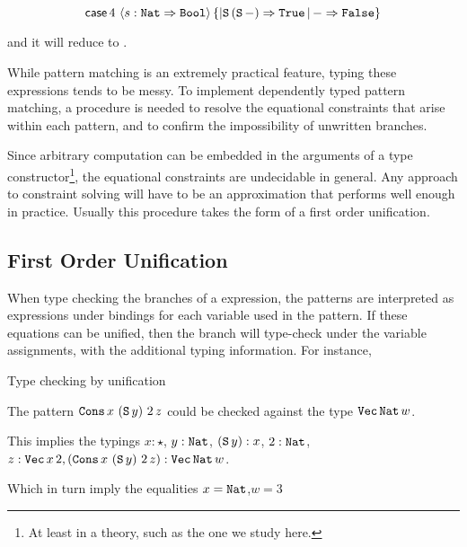 \[
\mathsf{case}{}\,4\,\left\langle s:\mathtt{Nat}{}\Rightarrow\mathtt{Bool}{}\right\rangle \left\{ |\mathtt{S}{}\left(\mathtt{S}{}\,-\right)\Rightarrow \mathtt{True}{}\,|\,-\Rightarrow \mathtt{False}{}\right\} 
\]

and it will reduce to \True{}.

While pattern matching is an extremely practical feature, typing these expressions tends to be messy.
To implement dependently typed pattern matching, a procedure is needed to resolve the equational constraints that arise within each pattern, and to confirm the impossibility of unwritten branches.

Since arbitrary computation can be embedded in the arguments of a type constructor\footnote{
  At least in a \fullSp{} theory, such as the one we study here.
}, the equational constraints are undecidable in general.
Any approach to constraint solving will have to be an approximation that performs well enough in practice.
Usually this procedure takes the form of a first order unification. 




\subsection{First Order Unification}

When type checking the branches of a \case{} expression, the patterns are interpreted as expressions under bindings for each variable used in the pattern.
If these equations can be unified, then the branch will type-check under the variable assignments, with the additional typing information.
For instance,
\begin{example}
Type checking by unification

The pattern $\mathtt{Cons}{}\,x\,\left(\mathtt{S}{}\,y\right)\,2\,z$ could be checked against the type $\mathtt{Vec}{}\,\mathtt{Nat}{}\,w$.

This implies the typings $x:\star$, $y:\mathtt{Nat}{}$, $\left(\mathtt{S}{}\,y\right):x$, $2:\mathtt{Nat}{}$, $z:\mathtt{Vec}{}\,x\,2,\left(\mathtt{Cons}{}\,x\,\left(\mathtt{S}{}\,y\right)\,2\,z\right):\mathtt{Vec}{}\,\mathtt{Nat}{}\,w$.

Which in turn imply the equalities $x=\mathtt{Nat}{}$,$w=3$
\end{example}

